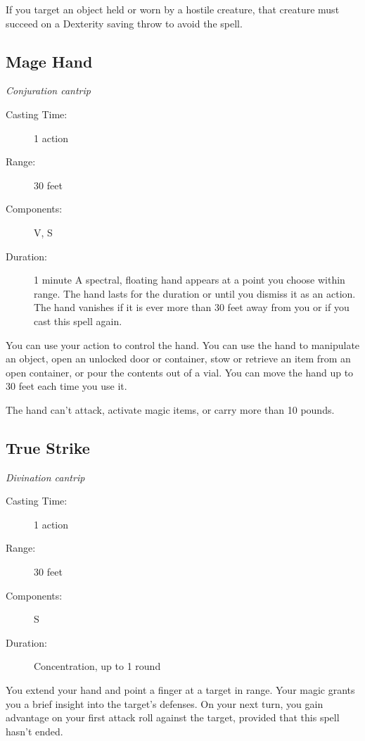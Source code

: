 \documentclass[letterpaper,10pt,twoside,twocolumn,openany]{book}
\begin{document}
If you target an object held or worn by a hostile creature, that creature must succeed on a Dexterity saving throw to avoid the spell.

\subsection{Mage Hand} \hypertarget{Mage Hand}{}
\begin{hangingpar}
	\textit{Conjuration cantrip}
\end{hangingpar}

\begin{description}
	\item[Casting Time:]  1 action 
	\item[Range:] 30 feet 
	\item[Components:] V, S 
	\item[Duration:] 1 minute A spectral, floating hand appears at a point you choose within range. The hand lasts for the duration or until you dismiss it as an action. The hand vanishes if it is ever more than 30 feet away from you or if you cast this spell again. 
\end{description}

You can use your action to control the hand. You can use the hand to manipulate an object, open an unlocked door or container, stow or retrieve an item from an open container, or pour the contents out of a vial. You can move the hand up to 30 feet each time you use it.

The hand can't attack, activate magic items, or carry more than 10 pounds. 

\subsection{True Strike} \hypertarget{True Strike}{}
\begin{hangingpar}
	\textit{Divination cantrip}
\end{hangingpar}

\begin{description}
	\item[Casting Time:] 1 action 
	\item[Range:] 30 feet 
	\item[Components:] S 
	\item[Duration:] Concentration, up to 1 round 
\end{description}

You extend your hand and point a finger at a target in range. Your magic grants you a brief insight into the target's defenses. On your next turn, you gain advantage on your first attack roll against the target, provided that this spell hasn't ended.
\end{document}
